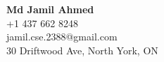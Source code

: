 \begin{flushleft}
\textbf{Md Jamil Ahmed} \\
+1 437 662 8248 \\
jamil.cse.2388@gmail.com \\
30 Driftwood Ave, North York, ON
\end{flushleft}